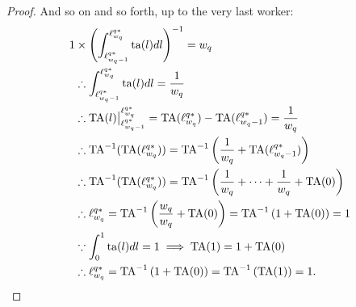 \documentclass[hidelinks, nonatbib]{elsarticle}
\begin{document}
\begin{lemma}
\begin{proof}
        And so on and so forth, up to the very last worker:
        \begin{align}
        1 
        &\times 
        \left(
            \int_{\ell_{w_q - 1}^{q*}}^{\ell_{w_q}^{q*}}
            \text{ta}(l)
            dl
        \right) ^ {-1}
        =
        w_q
        \\
        &\therefore
        \int_{\ell_{w_q - 1}^{q*}}^{\ell_{w_q}^{q*}}
        \text{ta}(l)
        dl
        =
        \frac{1}{w_q}
        \\
        &\therefore
        \text{TA}(l)
        \big|_{\ell_{w_q - 1}^{q*}}^{\ell_{w_q}^{q*}}
        =
        \text{TA}(\ell_{w_q}^{q*})
        -
        \text{TA}(\ell_{w_q - 1}^{q*})
        =
        \frac{1}{w_q}
        \\
        &\therefore
        \text{TA}^{-1}(
            \text{TA}(\ell_{w_q}^{q*})
        )
        =
        \text{TA}^{-1}\left(
            \frac{1}{w_q}
            +
            \text{TA}(\ell_{w_q - 1}^{q*})
        \right)
        \\
        &\therefore
        \text{TA}^{-1}(
            \text{TA}(\ell_{w_q}^{q*})
        )
        =
        \text{TA}^{-1}\left(
            \frac{1}{w_q}
            +
            \dots
            +
            \frac{1}{w_q}
            +
            \text{TA}(0)
        \right)
        \\
        &\therefore
        \ell_{w_q}^{q*}
        =
        \text{TA}^{-1}\left(
            \frac{w_q}{w_q}
            +
            \text{TA}(0)
        \right)
        =
        \text{TA}^{-1}\left(
            1
            +
            \text{TA}(0)
        \right)
        =
        1
        \\
        &
        \because
        \int_{0}^{1}{
            \text{ta}(l)
            dl
        }
        =
        1
        \implies
        \text{TA}(1)
        =
        1 + \text{TA}(0)
        \\
        &
        \therefore
        \ell_{w_q}^{q*}
        =
        \text{TA}^{-1}\left(
            1
            +
            \text{TA}(0)
        \right)
        = 
        \text{TA}^{-1}\left(
            \text{TA}(1)
        \right)
        = 
        1
        .
        \end{align}

\end{proof}
\end{lemma}
\end{document}
